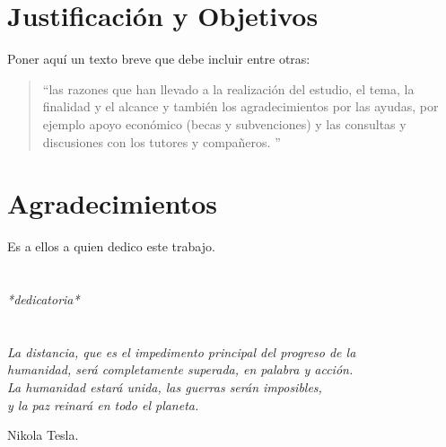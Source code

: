 
\chapter*{Justificación y Objetivos}
\thispagestyle{empty}
Poner aquí un texto breve que debe incluir entre otras:
\begin{quote}
``las razones que han llevado a la realización del estudio, el tema, la finalidad y el alcance y también los agradecimientos por las ayudas, por ejemplo apoyo económico (becas y subvenciones) y las consultas y discusiones con los tutores y compañeros. ''
\end{quote}


\cleardoublepage %
\chapter*{Agradecimientos}

\thispagestyle{empty}
\vspace{1cm}


Es a ellos a quien dedico este trabajo.

\cleardoublepage %
\chapter*{}
\setlength{\leftmargin}{0.5\textwidth}
\setlength{\parsep}{0cm}
\addtolength{\topsep}{0.5cm}
\begin{flushright}
\small\em{
*dedicatoria*\\
 
}
\end{flushright}


\cleardoublepage %
\chapter*{}
\setlength{\leftmargin}{0.5\textwidth}
\setlength{\parsep}{0cm}
\addtolength{\topsep}{0.5cm}
\begin{flushright}
\small\em{
La distancia, que es el impedimento principal del progreso de la \\ humanidad, será completamente superada, en palabra y acción.\\
La humanidad estará unida, las guerras serán imposibles, \\
y la paz reinará en todo el planeta.
}
\end{flushright}
\begin{flushright}
\small{
Nikola Tesla.
}
\end{flushright}
\cleardoublepage %
